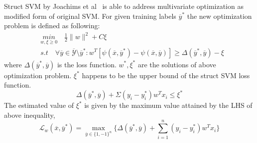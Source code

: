 \documentclass{article} %
\begin{document}
Struct SVM by Joachims et al~\cite{c1} is able to address multivariate optimization as modified form of original SVM. For given training labels $\overline{y}^*$ the new optimization problem is defined as following:
\begin{equation*}
\begin{split}
& \underset{w,\xi \geq 0}{min} \quad \frac{1}{2}\|w\|^2+C\xi\\
& s.t \quad \forall\overline{y} \in \overline{\mathcal{Y}}\setminus\overline{y}^*:w^T[\psi(\overline{x},\overline{y}^*)- \psi(\overline{x},\overline{y})]\geq \Delta(\overline{y}^*,\overline{y})-\xi
\end{split}
\end{equation*}
where $\Delta(\overline{y}^*,\overline{y})$ is the loss function. $w^*, \xi^*$ are the solutions of above optimization problem. $\xi^*$ happens to be the upper bound of the struct SVM loss function.
\begin{equation*}
	\Delta(\overline{y}^*,\overline{y}) + \Sigma (y_i - y_i^*)w^Tx_i \leq \xi^*
\end{equation*}
The estimated value of $\xi^*$ is given by the maximum value attained by the LHS of above inequality,
\begin{equation}
\label{eqn:1}
\mathcal L_w(\overline{x},\overline{y}^*)=\max_{\overline{y}\in\{1,-1\}^n}\{\Delta(\overline{y}^*,\overline{y}) + \sum_{i=1}^n (y_i - y_i^*)w^Tx_i\}
\end{equation}
\end{document}
